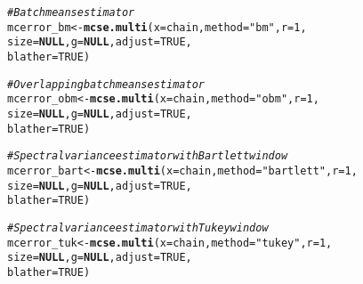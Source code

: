 \documentclass[11pt]{article}\usepackage[]{graphicx}\usepackage[]{color}
\makeatletter
\newcommand{\hlnum}[1]{\textcolor[rgb]{0.686,0.059,0.569}{#1}}%
\newcommand{\hlstr}[1]{\textcolor[rgb]{0.192,0.494,0.8}{#1}}%
\newcommand{\hlcom}[1]{\textcolor[rgb]{0.678,0.584,0.686}{\textit{#1}}}%
\newcommand{\hlstd}[1]{\textcolor[rgb]{0.345,0.345,0.345}{#1}}%
\newcommand{\hlkwa}[1]{\textcolor[rgb]{0.161,0.373,0.58}{\textbf{#1}}}%
\newcommand{\hlkwb}[1]{\textcolor[rgb]{0.69,0.353,0.396}{#1}}%
\newcommand{\hlkwc}[1]{\textcolor[rgb]{0.333,0.667,0.333}{#1}}%
\newcommand{\hlkwd}[1]{\textcolor[rgb]{0.737,0.353,0.396}{\textbf{#1}}}%
\newenvironment{kframe}{%
 \def\at@end@of@kframe{}%
 \ifinner\ifhmode%
  \def\at@end@of@kframe{\end{minipage}}%
  \begin{minipage}{\columnwidth}%
 \fi\fi%
 \def\FrameCommand##1{\hskip\@totalleftmargin \hskip-\fboxsep
 \colorbox{shadecolor}{##1}\hskip-\fboxsep
     \hskip-\linewidth \hskip-\@totalleftmargin \hskip\columnwidth}%
 \MakeFramed {\advance\hsize-\width
   \@totalleftmargin\z@ \linewidth\hsize
   \@setminipage}}%
 {\par\unskip\endMakeFramed%
 \at@end@of@kframe}
\newenvironment{knitrout}{}{} %
\makeatother
\begin{document}
\begin{knitrout}
\color{fgcolor}\begin{kframe}
\begin{alltt}
\hlcom{# Batch means estimator}
\hlstd{mcerror_bm} \hlkwb{<-} \hlkwd{mcse.multi}\hlstd{(}\hlkwc{x} \hlstd{= chain,} \hlkwc{method} \hlstd{=}  \hlstr{"bm"}\hlstd{,} \hlkwc{r} \hlstd{=} \hlnum{1}\hlstd{,}
                         \hlkwc{size} \hlstd{=} \hlkwa{NULL}\hlstd{,} \hlkwc{g} \hlstd{=} \hlkwa{NULL}\hlstd{,} \hlkwc{adjust} \hlstd{=} \hlnum{TRUE}\hlstd{,}
                         \hlkwc{blather} \hlstd{=} \hlnum{TRUE}\hlstd{)}
\end{alltt}


{\ttfamily\noindent\bfseries\color{errorcolor}{\#\# Error in as.matrix(x): object 'chain' not found}}\begin{alltt}
\hlcom{# Overlapping batch means estimator}
\hlstd{mcerror_obm} \hlkwb{<-} \hlkwd{mcse.multi}\hlstd{(}\hlkwc{x} \hlstd{= chain,} \hlkwc{method} \hlstd{=}  \hlstr{"obm"}\hlstd{,} \hlkwc{r} \hlstd{=} \hlnum{1}\hlstd{,}
                         \hlkwc{size} \hlstd{=} \hlkwa{NULL}\hlstd{,} \hlkwc{g} \hlstd{=} \hlkwa{NULL}\hlstd{,} \hlkwc{adjust} \hlstd{=} \hlnum{TRUE}\hlstd{,}
                         \hlkwc{blather} \hlstd{=} \hlnum{TRUE}\hlstd{)}
\end{alltt}


{\ttfamily\noindent\bfseries\color{errorcolor}{\#\# Error in as.matrix(x): object 'chain' not found}}\begin{alltt}
\hlcom{# Spectral variance estimator with Bartlett window}
\hlstd{mcerror_bart} \hlkwb{<-} \hlkwd{mcse.multi}\hlstd{(}\hlkwc{x} \hlstd{= chain,} \hlkwc{method} \hlstd{=}  \hlstr{"bartlett"}\hlstd{,} \hlkwc{r} \hlstd{=} \hlnum{1}\hlstd{,}
                           \hlkwc{size} \hlstd{=} \hlkwa{NULL}\hlstd{,} \hlkwc{g} \hlstd{=} \hlkwa{NULL}\hlstd{,} \hlkwc{adjust} \hlstd{=} \hlnum{TRUE}\hlstd{,}
                           \hlkwc{blather} \hlstd{=} \hlnum{TRUE}\hlstd{)}
\end{alltt}


{\ttfamily\noindent\bfseries\color{errorcolor}{\#\# Error in as.matrix(x): object 'chain' not found}}\begin{alltt}
\hlcom{# Spectral variance estimator with Tukey window}
\hlstd{mcerror_tuk} \hlkwb{<-} \hlkwd{mcse.multi}\hlstd{(}\hlkwc{x} \hlstd{= chain,} \hlkwc{method} \hlstd{=}  \hlstr{"tukey"}\hlstd{,} \hlkwc{r} \hlstd{=} \hlnum{1}\hlstd{,}
                          \hlkwc{size} \hlstd{=} \hlkwa{NULL}\hlstd{,} \hlkwc{g} \hlstd{=} \hlkwa{NULL}\hlstd{,} \hlkwc{adjust} \hlstd{=} \hlnum{TRUE}\hlstd{,}
                          \hlkwc{blather} \hlstd{=} \hlnum{TRUE}\hlstd{)}
\end{alltt}



\end{kframe}
\end{knitrout}
\end{document}
